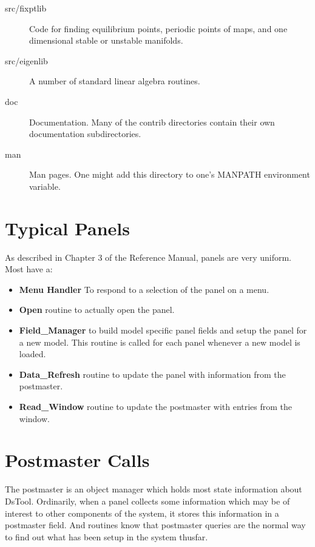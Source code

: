 \begin{description}
  \item[src/fixptlib] Code for finding equilibrium
  points, periodic points of maps, and one dimensional stable or
  unstable manifolds.

  \item[src/eigenlib] A number of standard linear 
  algebra routines. 

  \item[doc] Documentation. Many of the contrib directories
  contain their own documentation subdirectories.

  \item[man] Man pages. One might add this directory to one's
  MANPATH environment variable.

\end{description}

\section{Typical Panels}

As described in Chapter 3 of the Reference Manual, panels are very
uniform. Most have a:
\begin{itemize}
	\item {\bf Menu Handler} To respond to a selection of the panel on
	a menu.
	\item {\bf Open } routine to actually open the panel.
	\item {\bf Field\_Manager} to build model specific panel fields
	and setup the panel for a new model. This routine is called
	for each panel whenever a new model is loaded.
	\item {\bf Data\_Refresh} routine to update the panel
	with information from the postmaster.
	\item {\bf Read\_Window} routine to update the postmaster
	with entries from the window.
\end{itemize}

\section{Postmaster Calls}

The postmaster is an object manager which holds most state information
about DsTool. Ordinarily, when a panel  collects some information
which may be of interest to other components of the system, it
stores this information in a postmaster field. And routines know that
postmaster queries are the normal way to find out what has been
setup in the system thusfar.


